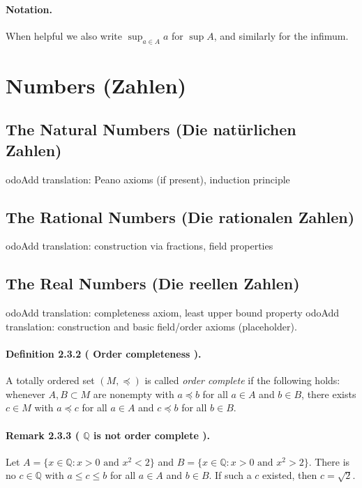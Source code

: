 \documentclass[12pt,a4paper]{article}
\newcommand{\Q}{\mathbb{Q}}
\newcommand{\NumberedDefinition}[3]{%
	\paragraph{Definition #1 ( #2 ).} #3\par
}
\newcommand{\NumberedRemark}[3]{%
  \paragraph{Remark #1 ( #2 ).} #3\par
}
\theoremstyle{plain}
\theoremstyle{definition}
\theoremstyle{remark}
\begin{document}
\paragraph{Notation.} When helpful we also write \(\sup_{a\in A} a\) for \(\sup A\), and similarly for the infimum.

\section{Numbers (Zahlen)}

\subsection{The Natural Numbers (Die natürlichen Zahlen)}
	odo{Add translation: Peano axioms (if present), induction principle}

\subsection{The Rational Numbers (Die rationalen Zahlen)}
	odo{Add translation: construction via fractions, field properties}

\subsection{The Real Numbers (Die reellen Zahlen)}
	odo{Add translation: completeness axiom, least upper bound property}
\label{subsec:reals}
	odo{Add translation: construction and basic field/order axioms (placeholder).}

\NumberedDefinition{2.3.2}{Order completeness}{A totally ordered set $(M,\preceq)$ is called \emph{order complete} if the following holds: whenever $A,B\subset M$ are nonempty with $a\preceq b$ for all $a\in A$ and $b\in B$, there exists $c\in M$ with $a\preceq c$ for all $a\in A$ and $c\preceq b$ for all $b\in B$.}

\NumberedRemark{2.3.3}{\(\Q\) is not order complete}{Let $A=\{x\in\Q: x>0\text{ and }x^2<2\}$ and $B=\{x\in\Q: x>0\text{ and }x^2>2\}$. There is no $c\in\Q$ with $a\le c\le b$ for all $a\in A$ and $b\in B$. If such a $c$ existed, then $c=\sqrt{2}$.}
\end{document}
